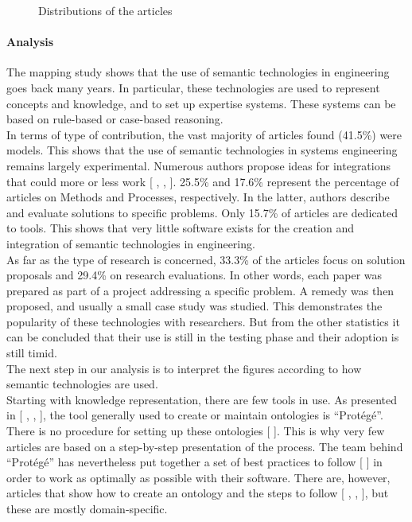 \begin{figure}[H]
\begin{subfigure}[b]{0.45\textwidth}
                \end{subfigure}
                \caption{\label{fig:distro-art} Distributions of the articles}
            \end{figure}
            
            \paragraph{Analysis\label{para:sms_analysis}}
            The mapping study shows that the use of semantic technologies in engineering goes back many years. In particular, these technologies are used to represent concepts and knowledge, and to set up expertise systems. These systems can be based on rule-based or case-based reasoning.\\
            
            In terms of type of contribution, the vast majority of articles found (41.5\%) were models. This shows that the use of semantic technologies in systems engineering remains largely experimental. Numerous authors propose ideas for integrations that could more or less work [ , , ]. 25.5\% and 17.6\% represent the percentage of articles on Methods and Processes, respectively. In the latter, authors describe and evaluate solutions to specific problems. Only 15.7\% of articles are dedicated to tools. This shows that very little software exists for the creation and integration of semantic technologies in engineering.\\
            As far as the type of research is concerned, 33.3\% of the articles focus on solution proposals and 29.4\% on research evaluations. In other words, each paper was prepared as part of a project addressing a specific problem. A remedy was then proposed, and usually a small case study was studied. This demonstrates the popularity of these technologies with researchers. But from the other statistics it can be concluded that their use is still in the testing phase and their adoption is still timid.\\

            The next step in our analysis is to interpret the figures according to how semantic technologies are used.\\
            Starting with knowledge representation, there are few tools in use. As presented in [ , , ], the tool generally used to create or maintain ontologies is “Protégé”. There is no procedure for setting up these ontologies [ ]. This is why very few articles are based on a step-by-step presentation of the process. The team behind “Protégé” has nevertheless put together a set of best practices to follow [ ] in order to work as optimally as possible with their software. There are, however, articles that show how to create an ontology and the steps to follow [ , , ], but these are mostly domain-specific. \\

